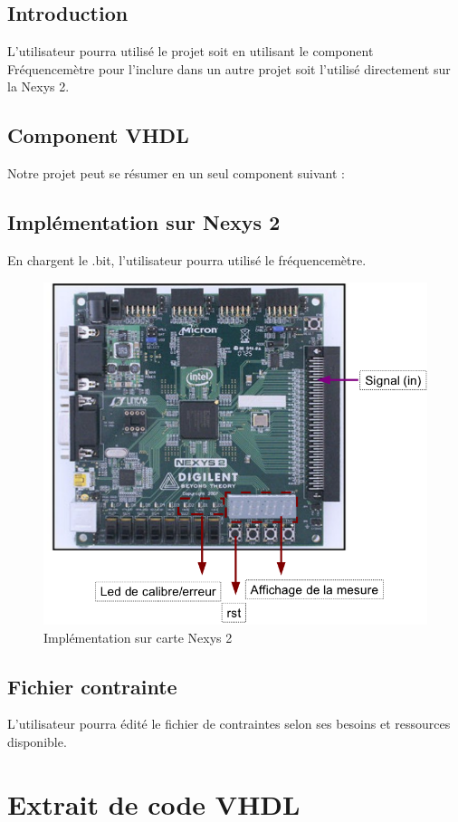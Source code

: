 \documentclass[a4paper,11pt]{article}
\begin{document}
\subsection{Introduction}
L'utilisateur pourra utilisé le projet soit en utilisant le component Fréquencemètre pour l'inclure dans un autre projet soit l'utilisé directement sur la Nexys 2.

\subsection{Component VHDL}
Notre projet peut se résumer en un seul component suivant :


\subsection{Implémentation sur Nexys 2}
En chargent le .bit, l'utilisateur pourra utilisé le fréquencemètre.
\begin{figure}[H]
\begin{center}
	\includegraphics[scale=.5]{fpga.png}
	\caption{Implémentation sur carte Nexys 2}
\end{center}
\end{figure}

\subsection{Fichier contrainte}
L'utilisateur pourra édité le fichier de contraintes selon ses besoins et ressources disponible.

\newpage
\section{Extrait de code VHDL}

\end{document}
